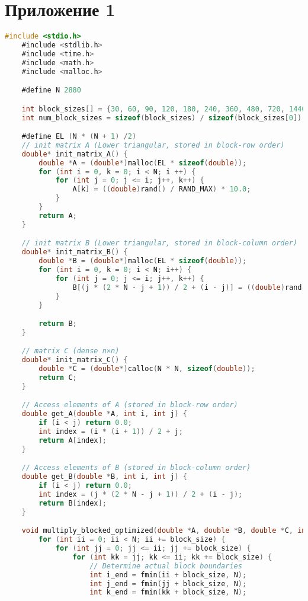 \documentclass[14pt, russian]{matmex-diploma-custom}
\begin{document}
\section{Приложение 1}
{\footnotesize
\begin{lstlisting}[language=C, caption={Приложение 1D массивов с блочной оптимизацией}]
    #include <stdio.h>
    #include <stdlib.h>
    #include <time.h>
    #include <math.h>
    #include <malloc.h>

    #define N 2880

    int block_sizes[] = {30, 60, 90, 120, 180, 240, 360, 480, 720, 1440};
    int num_block_sizes = sizeof(block_sizes) / sizeof(block_sizes[0]);

    #define EL (N * (N + 1) /2)
    // init matrix A (Lower triangular, stored in block-row order)
    double* init_matrix_A() {
        double *A = (double*)malloc(EL * sizeof(double));
        for (int i = 0, k = 0; i < N; i ++) {
            for (int j = 0; j <= i; j++, k++) {
                A[k] = ((double)rand() / RAND_MAX) * 10.0;
            }
        }
        return A;
    }

    // init matrix B (Lower triangular, stored in block-column order)
    double* init_matrix_B() {
        double *B = (double*)malloc(EL * sizeof(double));
        for (int i = 0, k = 0; i < N; i++) {
            for (int j = 0; j <= i; j++, k++) {
                B[(j * (2 * N - j + 1)) / 2 + (i - j)] = ((double)rand() / RAND_MAX) * 10.0;
            }
        }

        return B;
    }

    // matrix C (dense n×n)
    double* init_matrix_C() {
        double *C = (double*)calloc(N * N, sizeof(double));
        return C;
    }

    // Access elements of A (stored in block-row order)
    double get_A(double *A, int i, int j) {
        if (i < j) return 0.0;
        int index = (i * (i + 1)) / 2 + j;
        return A[index];
    }

    // Access elements of B (stored in block-column order)
    double get_B(double *B, int i, int j) {
        if (i < j) return 0.0;
        int index = (j * (2 * N - j + 1)) / 2 + (i - j);
        return B[index];
    }

    void multiply_blocked_optimized(double *A, double *B, double *C, int block_size) {
        for (int ii = 0; ii < N; ii += block_size) {
            for (int jj = 0; jj <= ii; jj += block_size) {
                for (int kk = jj; kk <= ii; kk += block_size) {
                    // Determine actual block boundaries
                    int i_end = fmin(ii + block_size, N);
                    int j_end = fmin(jj + block_size, N);
                    int k_end = fmin(kk + block_size, N);


\end{lstlisting}}
\end{document}
